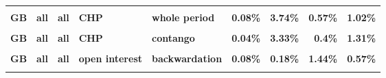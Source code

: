 \documentclass[
  authoryear,
  preprint,
  3p]{elsarticle}
\begin{document}
\begin{landscape}
\begin{longtable}[t]{>{}l>{}l>{}l>{}l>{}l>{}r>{}r>{}r>{}r}
\textbf{\cellcolor{gray!10}{GB}} & \textbf{\cellcolor{gray!10}{all}} & \textbf{\cellcolor{gray!10}{all}} & \textbf{\cellcolor{gray!10}{market}} & \textbf{\cellcolor{gray!10}{contango}} & \textcolor[HTML]{4285f4}{\textbf{\cellcolor{gray!10}{1.48\%}}} & \textcolor[HTML]{4285f4}{\textbf{\cellcolor{gray!10}{10.88\%}}} & \textcolor[HTML]{4285f4}{\textbf{\cellcolor{gray!10}{33.45\%}}} & \textcolor[HTML]{4285f4}{\textbf{\cellcolor{gray!10}{14.35\%}}}\\
\textbf{GB} & \textbf{all} & \textbf{all} & \textbf{CHP} & \textbf{whole period} & \textcolor[HTML]{4285f4}{\textbf{0.08\%}} & \textcolor[HTML]{4285f4}{\textbf{3.74\%}} & \textcolor[HTML]{4285f4}{\textbf{0.57\%}} & \textcolor[HTML]{4285f4}{\textbf{1.02\%}}\\
\textbf{\cellcolor{gray!10}{GB}} & \textbf{\cellcolor{gray!10}{all}} & \textbf{\cellcolor{gray!10}{all}} & \textbf{\cellcolor{gray!10}{CHP}} & \textbf{\cellcolor{gray!10}{backwardation}} & \textcolor[HTML]{4285f4}{\textbf{\cellcolor{gray!10}{0.24\%}}} & \textcolor[HTML]{4285f4}{\textbf{\cellcolor{gray!10}{4.26\%}}} & \textcolor[HTML]{4285f4}{\textbf{\cellcolor{gray!10}{1.09\%}}} & \textcolor[HTML]{4285f4}{\textbf{\cellcolor{gray!10}{0.72\%}}}\\
\textbf{GB} & \textbf{all} & \textbf{all} & \textbf{CHP} & \textbf{contango} & \textcolor[HTML]{4285f4}{\textbf{0.04\%}} & \textcolor[HTML]{4285f4}{\textbf{3.33\%}} & \textcolor[HTML]{4285f4}{\textbf{0.4\%}} & \textcolor[HTML]{4285f4}{\textbf{1.31\%}}\\
\addlinespace
\textbf{\cellcolor{gray!10}{GB}} & \textbf{\cellcolor{gray!10}{all}} & \textbf{\cellcolor{gray!10}{all}} & \textbf{\cellcolor{gray!10}{open interest}} & \textbf{\cellcolor{gray!10}{whole period}} & \textcolor[HTML]{4285f4}{\textbf{\cellcolor{gray!10}{0.07\%}}} & \textcolor[HTML]{4285f4}{\textbf{\cellcolor{gray!10}{0.34\%}}} & \textcolor[HTML]{4285f4}{\textbf{\cellcolor{gray!10}{2.17\%}}} & \textcolor[HTML]{4285f4}{\textbf{\cellcolor{gray!10}{0.42\%}}}\\
\textbf{GB} & \textbf{all} & \textbf{all} & \textbf{open interest} & \textbf{backwardation} & \textcolor[HTML]{4285f4}{\textbf{0.08\%}} & \textcolor[HTML]{4285f4}{\textbf{0.18\%}} & \textcolor[HTML]{4285f4}{\textbf{1.44\%}} & \textcolor[HTML]{4285f4}{\textbf{0.57\%}}\\
\textbf{\cellcolor{gray!10}{GB}} & \textbf{\cellcolor{gray!10}{all}} & \textbf{\cellcolor{gray!10}{all}} & \textbf{\cellcolor{gray!10}{open interest}} & \textbf{\cellcolor{gray!10}{contango}} & \textcolor[HTML]{4285f4}{\textbf{\cellcolor{gray!10}{0.22\%}}} & \textcolor[HTML]{4285f4}{\textbf{\cellcolor{gray!10}{0.59\%}}} & \textcolor[HTML]{4285f4}{\textbf{\cellcolor{gray!10}{2.7\%}}} & \textcolor[HTML]{4285f4}{\textbf{\cellcolor{gray!10}{0.39\%}}}\\

\end{longtable}
\end{landscape}
\end{document}
